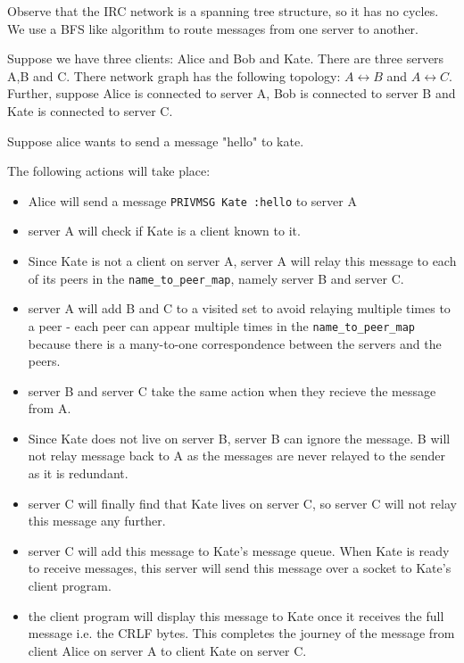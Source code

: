 \documentclass[letterpaper,twocolumn,10pt]{article}
\begin{document}
Observe that the IRC network is a spanning tree structure, so it has no cycles.
We use a BFS like algorithm to route messages from one server to another.

Suppose we have three clients: Alice and Bob and Kate. There are three servers
A,B and C. There network graph has the following topology: $A \leftrightarrow B$ and $A
	\leftrightarrow C$. Further, suppose Alice is connected to server A, Bob is connected to server B and Kate is
connected to server C.

Suppose alice wants to send a message "hello" to kate.

The following actions will take place:

\begin{itemize}

	\item Alice will send a message \verb|PRIVMSG Kate :hello| to server A
	\item server A
	      will check if Kate is a client known to it.
	\item Since Kate is not a client on server
	      A, server A will relay this message to each of its peers in the
	      \verb|name_to_peer_map|, namely server B and server C.
	\item server A will add B
	      and C to a visited set to avoid relaying multiple times to a peer -
	      each peer can appear multiple times in the \verb|name_to_peer_map| because
	      there is a many-to-one correspondence between the servers and the peers.
	\item server B and server C take the same action when they recieve the message from A.
	\item Since Kate does not live on server B, server B
	      can ignore the message. B will not relay message back to A as
	      the messages are never relayed to the sender as it is redundant.
	\item server C will finally find that Kate lives on server C, so server C
	      will not relay this message any further.
	\item server C will add this message to Kate's message queue. When Kate is
	      ready to receive messages,
	      this server will send this message over a socket to Kate's client
	      program.
	\item the client program will display this message to Kate once it receives the
	      full message i.e. the CRLF bytes. This completes the journey of the message from client Alice
	      on server A to client Kate on server C.

\end{itemize}
\end{document}
